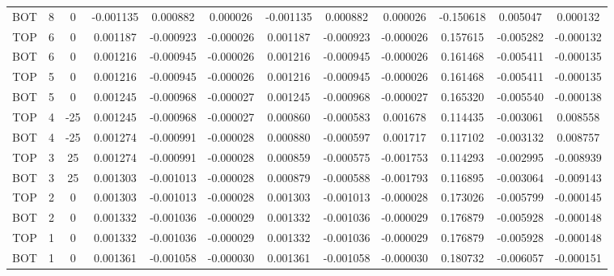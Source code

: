 {\begin{tabular}{cccccccccccc}
BOT &    8 &            0 & -0.001135 &  0.000882 &  0.000026 & -0.001135 &  0.000882 &  0.000026 &      -0.150618 &       0.005047 &       0.000132 \\
TOP &    6 &            0 &  0.001187 & -0.000923 & -0.000026 &  0.001187 & -0.000923 & -0.000026 &       0.157615 &      -0.005282 &      -0.000132 \\
BOT &    6 &            0 &  0.001216 & -0.000945 & -0.000026 &  0.001216 & -0.000945 & -0.000026 &       0.161468 &      -0.005411 &      -0.000135 \\
TOP &    5 &            0 &  0.001216 & -0.000945 & -0.000026 &  0.001216 & -0.000945 & -0.000026 &       0.161468 &      -0.005411 &      -0.000135 \\
BOT &    5 &            0 &  0.001245 & -0.000968 & -0.000027 &  0.001245 & -0.000968 & -0.000027 &       0.165320 &      -0.005540 &      -0.000138 \\
TOP &    4 &          -25 &  0.001245 & -0.000968 & -0.000027 &  0.000860 & -0.000583 &  0.001678 &       0.114435 &      -0.003061 &       0.008558 \\
BOT &    4 &          -25 &  0.001274 & -0.000991 & -0.000028 &  0.000880 & -0.000597 &  0.001717 &       0.117102 &      -0.003132 &       0.008757 \\
TOP &    3 &           25 &  0.001274 & -0.000991 & -0.000028 &  0.000859 & -0.000575 & -0.001753 &       0.114293 &      -0.002995 &      -0.008939 \\
BOT &    3 &           25 &  0.001303 & -0.001013 & -0.000028 &  0.000879 & -0.000588 & -0.001793 &       0.116895 &      -0.003064 &      -0.009143 \\
TOP &    2 &            0 &  0.001303 & -0.001013 & -0.000028 &  0.001303 & -0.001013 & -0.000028 &       0.173026 &      -0.005799 &      -0.000145 \\
BOT &    2 &            0 &  0.001332 & -0.001036 & -0.000029 &  0.001332 & -0.001036 & -0.000029 &       0.176879 &      -0.005928 &      -0.000148 \\
TOP &    1 &            0 &  0.001332 & -0.001036 & -0.000029 &  0.001332 & -0.001036 & -0.000029 &       0.176879 &      -0.005928 &      -0.000148 \\
BOT &    1 &            0 &  0.001361 & -0.001058 & -0.000030 &  0.001361 & -0.001058 & -0.000030 &       0.180732 &      -0.006057 &      -0.000151 \\
\bottomrule
\end{tabular}
}%

